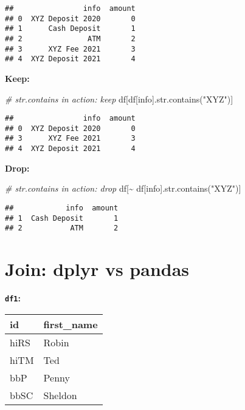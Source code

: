 \documentclass[
]{book}
\newenvironment{Shaded}{\begin{snugshade}}{\end{snugshade}}
\newcommand{\BuiltInTok}[1]{#1}
\newcommand{\CommentTok}[1]{\textcolor[rgb]{0.56,0.35,0.01}{\textit{#1}}}
\newcommand{\NormalTok}[1]{#1}
\newcommand{\OperatorTok}[1]{\textcolor[rgb]{0.81,0.36,0.00}{\textbf{#1}}}
\newcommand{\StringTok}[1]{\textcolor[rgb]{0.31,0.60,0.02}{#1}}
\begin{document}
\begin{verbatim}
##                info  amount
## 0  XYZ Deposit 2020       0
## 1      Cash Deposit       1
## 2               ATM       2
## 3      XYZ Fee 2021       3
## 4  XYZ Deposit 2021       4
\end{verbatim}

\textbf{Keep:}

\begin{Shaded}
\begin{Highlighting}[]
\CommentTok{\# str.contains in action: keep}
\NormalTok{df[df[}\StringTok{\textquotesingle{}info\textquotesingle{}}\NormalTok{].}\BuiltInTok{str}\NormalTok{.contains(}\StringTok{"XYZ"}\NormalTok{)]}
\end{Highlighting}
\end{Shaded}

\begin{verbatim}
##                info  amount
## 0  XYZ Deposit 2020       0
## 3      XYZ Fee 2021       3
## 4  XYZ Deposit 2021       4
\end{verbatim}

\textbf{Drop:}

\begin{Shaded}
\begin{Highlighting}[]
\CommentTok{\# str.contains in action: drop}
\NormalTok{df[}\OperatorTok{\textasciitilde{}}\NormalTok{ df[}\StringTok{\textquotesingle{}info\textquotesingle{}}\NormalTok{].}\BuiltInTok{str}\NormalTok{.contains(}\StringTok{"XYZ"}\NormalTok{)]}
\end{Highlighting}
\end{Shaded}

\begin{verbatim}
##            info  amount
## 1  Cash Deposit       1
## 2           ATM       2
\end{verbatim}

\hypertarget{join-dplyr-vs-pandas}{%
\chapter{Join: dplyr vs pandas}\label{join-dplyr-vs-pandas}}

\textbf{\texttt{df1}:}

\begin{longtable}[]{@{}ll@{}}
\toprule
id & first\_name \\
\midrule
\endhead
hiRS & Robin \\
hiTM & Ted \\
bbP & Penny \\
bbSC & Sheldon \\
\bottomrule
\end{longtable}
\end{document}
